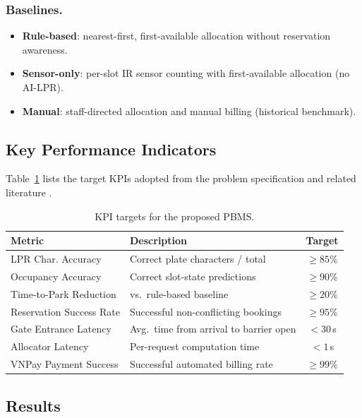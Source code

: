 \documentclass[runningheads]{llncs}
\begin{document}
\subsubsection{Baselines.}
\begin{itemize}
  \item \textbf{Rule-based}: nearest-first, first-available
        allocation without reservation awareness.
  \item \textbf{Sensor-only}: per-slot IR sensor counting
        with first-available allocation (no AI-LPR).
  \item \textbf{Manual}: staff-directed allocation and
        manual billing (historical benchmark).
\end{itemize}

\subsection{Key Performance Indicators}

Table~\ref{tab:kpi} lists the target KPIs adopted from the
problem specification and related literature
\cite{ref_plosone2025,ref_dhopre2024}.

\begin{table}[ht]
\caption{KPI targets for the proposed PBMS.}\label{tab:kpi}
\begin{tabular}{llc}
\toprule
\textbf{Metric} & \textbf{Description} & \textbf{Target} \\
\midrule
LPR Char. Accuracy & Correct plate characters / total & $\geq 85\%$ \\
Occupancy Accuracy & Correct slot-state predictions & $\geq 90\%$ \\
Time-to-Park Reduction & vs.\ rule-based baseline & $\geq 20\%$ \\
Reservation Success Rate & Successful non-conflicting bookings & $\geq 95\%$ \\
Gate Entrance Latency & Avg.\ time from arrival to barrier open & $< 30$\,s \\
Allocator Latency & Per-request computation time & $< 1$\,s \\
VNPay Payment Success & Successful automated billing rate & $\geq 99\%$ \\
\bottomrule
\end{tabular}
\end{table}

\subsection{Results}
\end{document}
